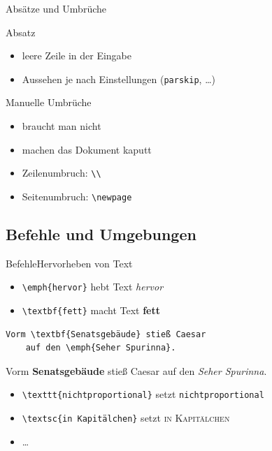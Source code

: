 \malte


\begin{Frame}[fragile]{Absätze und Umbrüche}
  \begin{Block}{Absatz}
    \begin{itemize}
      \item leere Zeile in der Eingabe
      \item Aussehen je nach Einstellungen (\lstinline-parskip-, \ldots)
    \end{itemize}
  \end{Block}

  \begin{Block}{Manuelle Umbrüche}
    \begin{itemize}
      \item braucht man nicht
      \item machen das Dokument kaputt
      \item Zeilenumbruch: \lstinline-\\-
      \item Seitenumbruch: \lstinline-\newpage-
    \end{itemize}
  \end{Block}
\end{Frame}

\subsection{Befehle und Umgebungen}

\begin{Frame}[fragile]{Befehle}{Hervorheben von Text}
  \begin{itemize}
    \item \lstinline-\emph{hervor}- hebt Text \emph{hervor}
    \item \lstinline-\textbf{fett}- macht Text \textbf{fett}
  \end{itemize}

  \xxx

  \begin{lstlisting}[gobble=4]
    Vorm \textbf{Senatsgebäude} stieß Caesar
    auf den \emph{Seher Spurinna}.
  \end{lstlisting}

  Vorm \textbf{Senatsgebäude} stieß Caesar
    auf den \emph{Seher Spurinna}.

  \xxx\pause

  \begin{itemize}
    \item \lstinline-\texttt{nichtproportional}- setzt \texttt{nichtproportional}
    \item \lstinline-\textsc{in Kapitälchen}- setzt \textsc{in Kapitälchen}
    \item \ldots
  \end{itemize}
\end{Frame}

